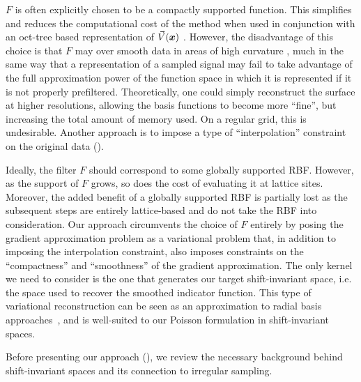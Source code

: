 $F$ is often explicitly chosen to be a compactly supported function. This simplifies and reduces the computational cost of the method when used in conjunction with an oct-tree based representation of $\vec{V}(\boldsymbol{x})$ \cite{Kazhdan06}. However, the  disadvantage of this choice is that $F$ may over smooth data in areas of high curvature \cite{reconbench}, much in the same way that a representation of a sampled signal may fail to take advantage of the full approximation power of the function space in which it is represented if it is not properly prefiltered. Theoretically, one could simply reconstruct the surface at higher resolutions, allowing the basis functions to become more ``fine'', but increasing the total amount of memory used. On a regular grid, this is undesirable. Another approach is to impose a type of ``interpolation'' constraint on the original data \cite{screenedk} ().

Ideally, the filter $F$ should correspond to some globally supported RBF. However, as the support of $F$ grows, so does the cost of evaluating it at lattice sites. Moreover, the added benefit of a globally supported RBF is partially lost as the subsequent steps are entirely lattice-based and do not take the RBF into consideration. Our approach circumvents the choice of $F$ entirely by posing the gradient approximation problem as a variational problem that, in addition to imposing the interpolation constraint, also imposes constraints on the ``compactness'' and ``smoothness'' of the gradient approximation. The only kernel we need to consider is the one that generates our target shift-invariant space, i.e. the space used to recover the smoothed indicator function. This type of variational reconstruction can be seen as an approximation to radial basis approaches~\cite{variational}, and is well-suited to our Poisson formulation in shift-invariant spaces.

Before presenting our approach (), we review the necessary background behind shift-invariant spaces and its connection to irregular sampling.

